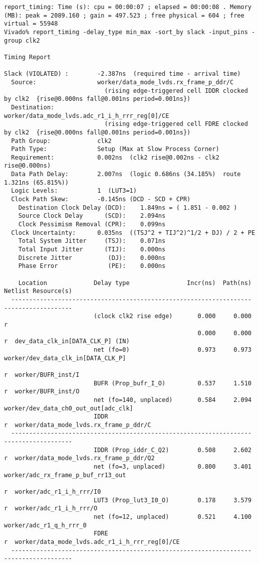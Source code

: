 \documentclass{article}
\begin{document}
\begin{lstlisting}
report_timing: Time (s): cpu = 00:00:07 ; elapsed = 00:00:08 . Memory (MB): peak = 2089.160 ; gain = 497.523 ; free physical = 604 ; free virtual = 55948
Vivado% report_timing -delay_type min_max -sort_by slack -input_pins -group clk2

Timing Report

Slack (VIOLATED) :        -2.387ns  (required time - arrival time)
  Source:                 worker/data_mode_lvds.rx_frame_p_ddr/C
                            (rising edge-triggered cell IDDR clocked by clk2  {rise@0.000ns fall@0.001ns period=0.001ns})
  Destination:            worker/data_mode_lvds.adc_r1_i_h_rrr_reg[0]/CE
                            (rising edge-triggered cell FDRE clocked by clk2  {rise@0.000ns fall@0.001ns period=0.001ns})
  Path Group:             clk2
  Path Type:              Setup (Max at Slow Process Corner)
  Requirement:            0.002ns  (clk2 rise@0.002ns - clk2 rise@0.000ns)
  Data Path Delay:        2.007ns  (logic 0.686ns (34.185%)  route 1.321ns (65.815%))
  Logic Levels:           1  (LUT3=1)
  Clock Path Skew:        -0.145ns (DCD - SCD + CPR)
    Destination Clock Delay (DCD):    1.849ns = ( 1.851 - 0.002 )
    Source Clock Delay      (SCD):    2.094ns
    Clock Pessimism Removal (CPR):    0.099ns
  Clock Uncertainty:      0.035ns  ((TSJ^2 + TIJ^2)^1/2 + DJ) / 2 + PE
    Total System Jitter     (TSJ):    0.071ns
    Total Input Jitter      (TIJ):    0.000ns
    Discrete Jitter          (DJ):    0.000ns
    Phase Error              (PE):    0.000ns

    Location             Delay type                Incr(ns)  Path(ns)    Netlist Resource(s)
  -------------------------------------------------------------------    -------------------
                         (clock clk2 rise edge)       0.000     0.000 r
                                                      0.000     0.000 r  dev_data_clk_in[DATA_CLK_P] (IN)
                         net (fo=0)                   0.973     0.973    worker/dev_data_clk_in[DATA_CLK_P]
                                                                      r  worker/BUFR_inst/I
                         BUFR (Prop_bufr_I_O)         0.537     1.510 r  worker/BUFR_inst/O
                         net (fo=140, unplaced)       0.584     2.094    worker/dev_data_ch0_out_out[adc_clk]
                         IDDR                                         r  worker/data_mode_lvds.rx_frame_p_ddr/C
  -------------------------------------------------------------------    -------------------
                         IDDR (Prop_iddr_C_Q2)        0.508     2.602 r  worker/data_mode_lvds.rx_frame_p_ddr/Q2
                         net (fo=3, unplaced)         0.800     3.401    worker/adc_rx_frame_p_buf_rr13_out
                                                                      r  worker/adc_r1_i_h_rrr/I0
                         LUT3 (Prop_lut3_I0_O)        0.178     3.579 r  worker/adc_r1_i_h_rrr/O
                         net (fo=12, unplaced)        0.521     4.100    worker/adc_r1_q_h_rrr_0
                         FDRE                                         r  worker/data_mode_lvds.adc_r1_i_h_rrr_reg[0]/CE
  -------------------------------------------------------------------    -------------------


\end{lstlisting}
\end{document}

